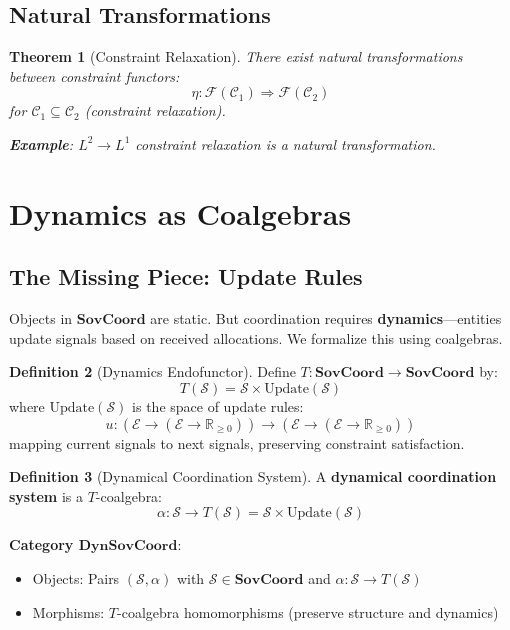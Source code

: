 \documentclass[11pt,a4paper]{article}
\newtheorem{theorem}{Theorem}[section]
\theoremstyle{definition}
\newtheorem{definition}[theorem]{Definition}
\theoremstyle{remark}
\newcommand{\E}{\mathcal{E}}
\newcommand{\C}{\mathcal{C}}
\newcommand{\SovCoord}{\mathbf{SovCoord}}
\begin{document}
\subsection{Natural Transformations}

\begin{theorem}[Constraint Relaxation]
There exist natural transformations between constraint functors:
\[ \eta: \mathcal{F}(\C_1) \Rightarrow \mathcal{F}(\C_2) \]
for $\C_1 \subseteq \C_2$ (constraint relaxation).

\textbf{Example}: $L^2 \to L^1$ constraint relaxation is a natural transformation.
\end{theorem}

\section{Dynamics as Coalgebras}

\subsection{The Missing Piece: Update Rules}

Objects in $\SovCoord$ are static. But coordination requires \textbf{dynamics}—entities update signals based on received allocations. We formalize this using coalgebras.

\begin{definition}[Dynamics Endofunctor]
Define $T: \SovCoord \to \SovCoord$ by:
\[ T(\mathcal{S}) = \mathcal{S} \times \text{Update}(\mathcal{S}) \]
where $\text{Update}(\mathcal{S})$ is the space of update rules:
\[ u: (\E \to (\E \to \mathbb{R}_{\ge 0})) \to (\E \to (\E \to \mathbb{R}_{\ge 0})) \]
mapping current signals to next signals, preserving constraint satisfaction.
\end{definition}

\begin{definition}[Dynamical Coordination System]
A \textbf{dynamical coordination system} is a $T$-coalgebra:
\[ \alpha: \mathcal{S} \to T(\mathcal{S}) = \mathcal{S} \times \text{Update}(\mathcal{S}) \]

\textbf{Category $\mathbf{DynSovCoord}$}:
\begin{itemize}
\item Objects: Pairs $(\mathcal{S}, \alpha)$ with $\mathcal{S} \in \SovCoord$ and $\alpha: \mathcal{S} \to T(\mathcal{S})$
\item Morphisms: $T$-coalgebra homomorphisms (preserve structure and dynamics)
\end{itemize}
\end{definition}
\end{document}
